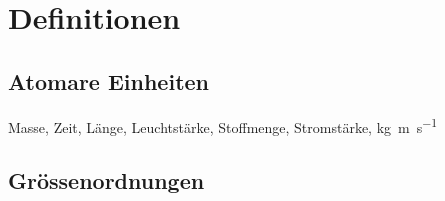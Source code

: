 \section{Definitionen}

\subsection{Atomare Einheiten}
Masse, Zeit, Länge, Leuchtstärke, Stoffmenge, Stromstärke, 
\si{\kilogram\metre\per\second}

\subsection{Grössenordnungen}
